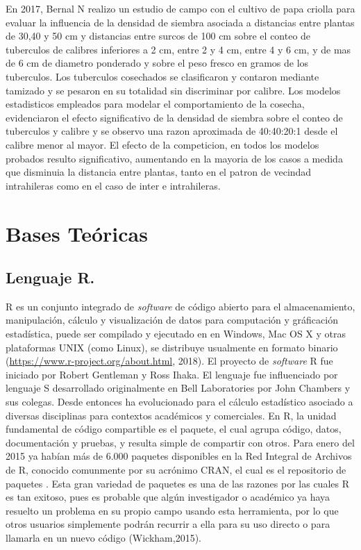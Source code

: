 En 2017, Bernal N realizo un estudio de campo con el cultivo de papa criolla para evaluar la influencia de la densidad de siembra asociada a distancias entre plantas de 30,40 y 50 cm y distancias entre surcos de 100 cm sobre el conteo de tuberculos de calibres inferiores a 2 cm, entre 2 y 4 cm, entre 4 y 6 cm, y de mas de 6 cm de diametro ponderado y sobre el peso fresco en gramos de los tuberculos. Los tuberculos cosechados se clasificaron y contaron mediante tamizado y se pesaron en su totalidad sin discriminar por calibre. Los modelos estadisticos empleados para modelar el comportamiento de la cosecha, evidenciaron el efecto significativo de la densidad de siembra sobre el conteo de tuberculos y calibre y se observo una razon aproximada de 40:40:20:1 desde el calibre menor al mayor. El efecto de la competicion, en todos los modelos probados resulto significativo, aumentando en la mayoria de los casos a medida que disminuia la distancia entre plantas, tanto en el patron de vecindad intrahileras como en el caso de inter e intrahileras.

\section{Bases Te\'oricas}

\subsection{Lenguaje R.}

R es un conjunto  integrado de \textit{software} de código abierto para el almacenamiento, manipulación, cálculo y visualización de datos para computación y gráficación estadística, puede ser compilado y ejecutado en  en Windows, Mac OS X y otras  plataformas UNIX (como Linux), se distribuye usualmente en formato binario (\url{https://www.r-project.org/about.html}, 2018). El proyecto de \emph{software} R fue iniciado por Robert Gentleman y Ross Ihaka. El lenguaje fue influenciado por  lenguaje S desarrollado originalmente en Bell Laboratories por John Chambers y sus colegas. Desde entonces ha evolucionado  para el cálculo estadístico asociado a diversas disciplinas para contextos académicos y comerciales. En R, la unidad fundamental de código compartible es el paquete, el cual agrupa código, datos, documentación y pruebas, y resulta simple de compartir con otros. Para enero del 2015 ya habían más de 6.000 paquetes disponibles en la Red Integral de Archivos de R, conocido comunmente por su acrónimo CRAN, el cual es el repositorio de paquetes . Esta gran variedad de paquetes es una de las razones por las cuales R es tan exitoso, pues es probable que algún investigador o académico ya haya resuelto un problema en su propio campo usando esta herramienta, por lo que otros usuarios simplemente podrán recurrir a ella para su uso directo o para llamarla en un nuevo código (Wickham,2015). \\


